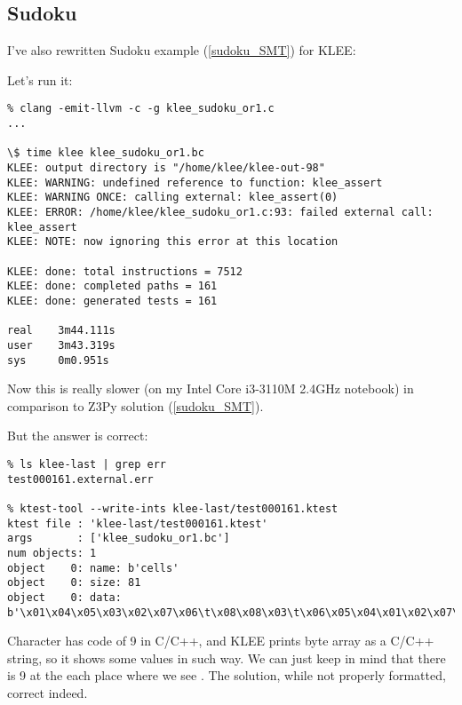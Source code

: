 \subsection{Sudoku}

I've also rewritten Sudoku example (\ref{sudoku_SMT}) for KLEE:



Let's run it:

\begin{lstlisting}
% clang -emit-llvm -c -g klee_sudoku_or1.c
...

\$ time klee klee_sudoku_or1.bc
KLEE: output directory is "/home/klee/klee-out-98"
KLEE: WARNING: undefined reference to function: klee_assert
KLEE: WARNING ONCE: calling external: klee_assert(0)
KLEE: ERROR: /home/klee/klee_sudoku_or1.c:93: failed external call: klee_assert
KLEE: NOTE: now ignoring this error at this location

KLEE: done: total instructions = 7512
KLEE: done: completed paths = 161
KLEE: done: generated tests = 161

real    3m44.111s
user    3m43.319s
sys     0m0.951s
\end{lstlisting}

Now this is really slower (on my Intel Core i3-3110M 2.4GHz notebook) in comparison to Z3Py solution (\ref{sudoku_SMT}).

But the answer is correct:

\begin{lstlisting}
% ls klee-last | grep err
test000161.external.err

% ktest-tool --write-ints klee-last/test000161.ktest
ktest file : 'klee-last/test000161.ktest'
args       : ['klee_sudoku_or1.bc']
num objects: 1
object    0: name: b'cells'
object    0: size: 81
object    0: data: b'\x01\x04\x05\x03\x02\x07\x06\t\x08\x08\x03\t\x06\x05\x04\x01\x02\x07\x06\x07\x02\t\x01\x08\x05\x04\x03\x04\t\x06\x01\x08\x05\x03\x07\x02\x02\x01\x08\x04\x07\x03\t\x05\x06\x07\x05\x03\x02\t\x06\x04\x08\x01\x03\x06\x07\x05\x04\x02\x08\x01\t\t\x08\x04\x07\x06\x01\x02\x03\x05\x05\x02\x01\x08\x03\t\x07\x06\x04'
\end{lstlisting}

Character  has code of 9 in C/C++,
and KLEE prints byte array as a C/C++ string, so it shows some values in such way.
We can just keep in mind that there is 9 at the each place where we see .
The solution, while not properly formatted, correct indeed.

